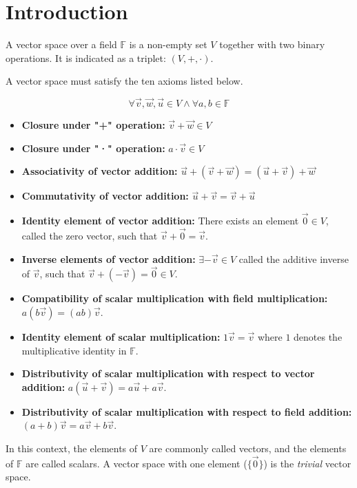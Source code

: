 \section{Introduction}

A vector space over a field \(\mathbb F\) is a non-empty set \(V\) together with two binary operations. It is indicated as a triplet: $(V, +, \cdot)$.

A vector space must satisfy the ten axioms listed below.

{\large$$\forall \vec v, \vec w, \vec u \in V \land \forall a, b \in \mathbb F$$}

\begin{itemize}
\item \textbf{Closure under "+" operation:}
    $\vec v + \vec w \in V$
\item \textbf{Closure under "·" operation:}
    $a \cdot \vec v \in V$
\item \textbf{Associativity of vector addition:} $\vec{u} + (\vec{v} + \vec{w}) = (\vec{u} + \vec{v}) + \vec{w}$
\item \textbf{Commutativity of vector addition:} $\vec{u} + \vec{v} = \vec{v} + \vec{u}$
\item \textbf{Identity element of vector addition:} There exists an element $\vec{0} \in V$, called the zero vector, such that $\vec{v} + \vec{0} = \vec{v}$.
\item \textbf{Inverse elements of vector addition:} $\exists -\vec{v} \in V$ called the additive inverse of $\vec{v}$, such that $\vec{v} + (-\vec{v}) = \vec{0} \in V$.
\item \textbf{Compatibility of scalar multiplication with field multiplication:} $a(b\vec{v}) = (ab)\vec{v}$.
\item \textbf{Identity element of scalar multiplication:} $1\vec{v} = \vec{v}$ where $1$ denotes the multiplicative identity in $\mathbb F$.
\item \textbf{Distributivity of scalar multiplication with respect to vector addition:} $a(\vec{u} + \vec{v}) = a\vec{u} + a\vec{v}$.
\item \textbf{Distributivity of scalar multiplication with respect to field addition:} $(a + b)\vec{v} = a\vec{v} + b\vec{v}$.
\end{itemize}

In this context, the elements of \(V\) are commonly called vectors, and the elements of \(\mathbb F\) are called scalars.
A vector space with one element {\normalfont ($\{\vec 0\}$)} is the \emph{trivial} vector space.
\\

